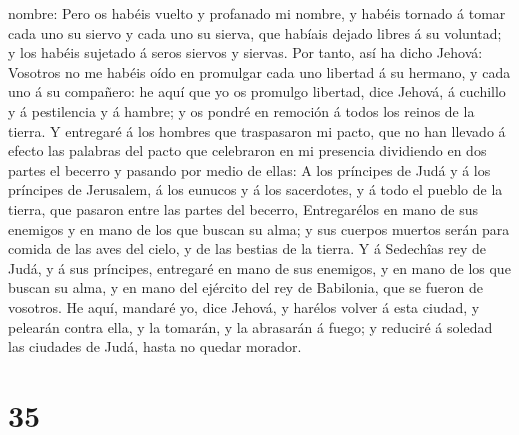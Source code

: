 nombre:  Pero os habéis vuelto y profanado mi nombre, y
habéis tornado á tomar cada uno su siervo y cada uno su sierva, que
habíais dejado libres á su voluntad; y los habéis sujetado á seros
siervos y siervas.  Por tanto, así ha dicho Jehová:
Vosotros no me habéis oído en promulgar cada uno libertad á su hermano,
y cada uno á su compañero: he aquí que yo os promulgo libertad, dice
Jehová, á cuchillo y á pestilencia y á hambre; y os pondré en remoción á
todos los reinos de la tierra.  Y entregaré á los hombres
que traspasaron mi pacto, que no han llevado á efecto las palabras del
pacto que celebraron en mi presencia dividiendo en dos partes el becerro
y pasando por medio de ellas:  A los príncipes de Judá y á
los príncipes de Jerusalem, á los eunucos y á los sacerdotes, y á todo
el pueblo de la tierra, que pasaron entre las partes del becerro,
 Entregarélos en mano de sus enemigos y en mano de los que
buscan su alma; y sus cuerpos muertos serán para comida de las aves del
cielo, y de las bestias de la tierra.  Y á Sedechîas rey de
Judá, y á sus príncipes, entregaré en mano de sus enemigos, y en mano de
los que buscan su alma, y en mano del ejército del rey de Babilonia, que
se fueron de vosotros.  He aquí, mandaré yo, dice Jehová, y
harélos volver á esta ciudad, y pelearán contra ella, y la tomarán, y la
abrasarán á fuego; y reduciré á soledad las ciudades de Judá, hasta no
quedar morador.

\hypertarget{section-34}{%
\section{35}\label{section-34}}

